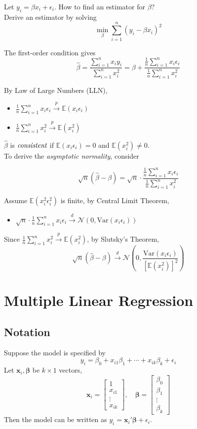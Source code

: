 \documentclass[%
 aip,
 jmp,%
 amsmath,amssymb,
 reprint,%
]{revtex4-1}
\def\N{{\mathbb N}}
\def\b{\beta}
\def\e{\epsilon}
\def\E{\mathbb{E}}
\def\N{\mathcal{N}} %
\def\Var{\mathrm{Var}}
\def\pto{\overset{p}{\to}}
\def\dto{\overset{d}{\to}}
\def\h{\hat}
\newcommand{\sumn}[1]{\sum_{i=1}^{n} #1}
\newcommand{\mean}[1]{\frac{1}{n}\sum_{i=1}^{n} #1}
\renewcommand{\vec}[1]{\bm{#1}}
\begin{document}
Let $y_i = \b x_i + \e_i $. How to find an estimator for $\b$? \\

Derive an estimator by solving
$$ \min_{\b} \sumn (y_i - \b x_i)^2 $$

The first-order condition gives
$$ \h\b = \frac{\sumn x_iy_i }{\sumn x_i^2} = \b + \frac{\mean x_i\e_i}{\mean x_i^2}$$

By Law of Large Numbers (LLN),
\begin{itemize}
    \item $\mean x_i\e_i \pto \E(x_i\e_i)$
    \item $\mean x_i^2 \pto \E(x_i^2)$
\end{itemize}

$\h\b$ is $\emph{consistent}$ if $\E(x_i\e_i)=0$ and $\E(x_i^2)\neq 0$.\\

To derive the \emph{asymptotic normality}, consider

$$ \sqrt{n} (\h\b - \b) = \sqrt{n}\cdot\frac{\mean x_i\e_i}{\mean x_i^2} $$

Assume $\E(x_i^2\e_i^2)$ is finite, by Central Limit Theorem,
\begin{itemize}
    \item $\sqrt{n}\cdot\mean x_i\e_i \dto \N(0, \Var{(x_i\e_i)})$
\end{itemize}

Since $\mean x_i^2 \pto \E(x_i^2)$, by Slutsky's Theorem,
$$ \sqrt{n} (\h\b - \b) \dto \N\left(0, \frac{\Var{(x_i\e_i)}}{[\E(x_i^2)]^2}\right) $$


\section{Multiple Linear Regression}

\subsection{Notation}
Suppose the model is specified by
$$ y_i = \b_0 + x_{i1}\b_1 + \cdots + x_{ik}\b_k + \e_i $$
Let $\vec x_i, \vec\b$ be $k \times 1$ vectors,
\[
\vec x_i =
\begin{bmatrix}
1 \\
x_{i1}\\
\vdots\\
x_{ik}
\end{bmatrix}, \quad
\vec \b =
\begin{bmatrix}
\b_0 \\
\b_1 \\
\vdots \\
\b_k
\end{bmatrix}
\]
Then the model can be written as $y_i = \vec x_i'\vec\b + \e_i$.\\
\end{document}
